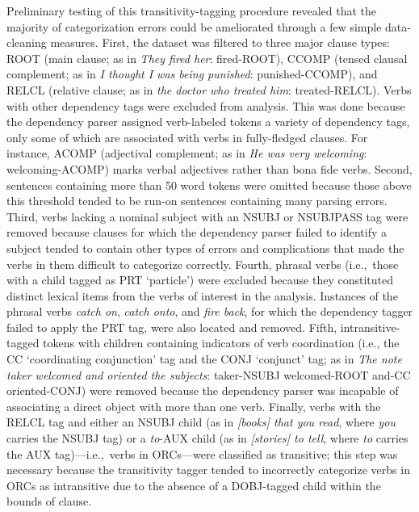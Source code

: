 Preliminary testing of this transitivity-tagging procedure revealed that the majority of categorization errors could be ameliorated through a few simple data-cleaning measures. First, the dataset was filtered to three major clause types: ROOT (main clause; as in \textit{They fired her}: fired-ROOT), CCOMP (tensed clausal complement; as in \textit{I thought I was being punished}: punished-CCOMP), and RELCL (relative clause; as in \textit{the doctor who treated him}: treated-RELCL). Verbs with other dependency tags were excluded from analysis. This was done because the dependency parser assigned verb-labeled tokens a variety of dependency tags, only some of which are associated with verbs in fully-fledged clauses. For instance, ACOMP (adjectival complement; as in \textit{He was very welcoming}: welcoming-ACOMP) marks verbal adjectives rather than bona fide verbs. Second, sentences containing more than 50 word tokens were omitted because those above this threshold tended to be run-on sentences containing many parsing errors. Third, verbs lacking a nominal subject with an NSUBJ or NSUBJPASS tag were removed because clauses for which the dependency parser failed to identify a subject tended to contain other types of errors and complications that made the verbs in them difficult to categorize correctly. Fourth, phrasal verbs (i.e.,~those with a child tagged as PRT `particle') were excluded because they constituted distinct lexical items from the verbs of interest in the analysis. Instances of the phrasal verbs \textit{catch on}, \textit{catch onto}, and \textit{fire back}, for which the dependency tagger failed to apply the PRT tag, were also located and removed. Fifth, intransitive-tagged tokens with children containing indicators of verb coordination (i.e., the CC `coordinating conjunction' tag and the CONJ `conjunct' tag; as in \textit{The note taker welcomed and oriented the subjects}: taker-NSUBJ welcomed-ROOT and-CC oriented-CONJ) were removed because the dependency parser was incapable of associating a direct object with more than one verb. Finally, verbs with the RELCL tag and either an NSUBJ child (as in \textit{[books] that you read}, where \textit{you} carries the NSUBJ tag) or a \textit{to}-AUX child (as in \textit{[stories] to tell}, where \textit{to} carries the AUX tag)---i.e.,~verbs in ORCs---were classified as transitive; this step was necessary because the transitivity tagger tended to incorrectly categorize verbs in ORCs as intransitive due to the absence of a DOBJ-tagged child within the bounds of clause.

